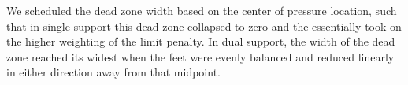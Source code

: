 We scheduled the dead zone width based on the center of pressure location, such that in single support this dead zone collapsed to zero and the  essentially took on the higher weighting of the limit penalty. In dual support, the width of the dead zone reached its widest when the feet were evenly balanced and reduced linearly in either direction away from that midpoint. 

%

%


